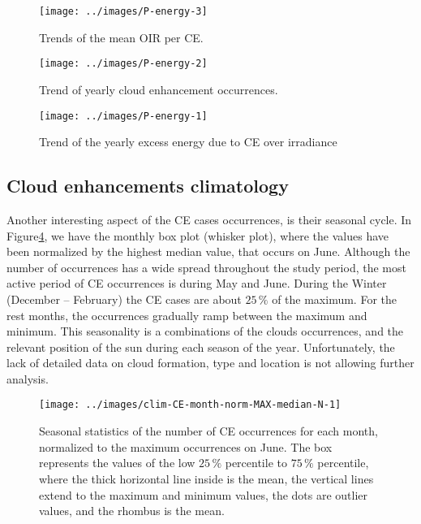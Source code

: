\documentclass[preprint, 5p,
authoryear]{elsarticle} %
\begin{document}
\begin{figure}

{\centering \texttt{[image: ../images/P-energy-3]} 

}

\caption{Trends of the mean OIR per CE.}\label{fig:P-energy-mean}
\end{figure}

\begin{figure}

{\centering \texttt{[image: ../images/P-energy-2]} 

}

\caption{Trend of yearly cloud enhancement occurrences.}\label{fig:P-energy-N}
\end{figure}

\begin{figure}

{\centering \texttt{[image: ../images/P-energy-1]} 

}

\caption{Trend of the yearly excess energy due to CE over irradiance}\label{fig:P-energy-sum}
\end{figure}

\hypertarget{cloud-enhancements-climatology}{%
\subsection{Cloud enhancements
climatology}\label{cloud-enhancements-climatology}}

Another interesting aspect of the CE cases occurrences, is their
seasonal cycle. In
Figure\nobreakspace{}\ref{fig:relative-month-occurrences}, we have the
monthly box plot (whisker plot), where the values have been normalized
by the highest median value, that occurs on June. Although the number of
occurrences has a wide spread throughout the study period, the most
active period of CE occurrences is during May and June. During the
Winter (December -- February) the CE cases are about \(25\,\%\) of the
maximum. For the rest months, the occurrences gradually ramp between the
maximum and minimum. This seasonality is a combinations of the clouds
occurrences, and the relevant position of the sun during each season of
the year. Unfortunately, the lack of detailed data on cloud formation,
type and location is not allowing further analysis.

\begin{figure}

{\centering \texttt{[image: ../images/clim-CE-month-norm-MAX-median-N-1]} 

}

\caption{Seasonal statistics of the number of CE occurrences for each month, normalized to the maximum occurrences on June. The box represents the values of the low $25\,\%$ percentile to $75\,\%$ percentile, where the thick horizontal line inside is the mean, the vertical lines extend to the maximum and minimum values, the dots are outlier values, and the rhombus is the mean.}\label{fig:relative-month-occurrences}
\end{figure}
\end{document}
